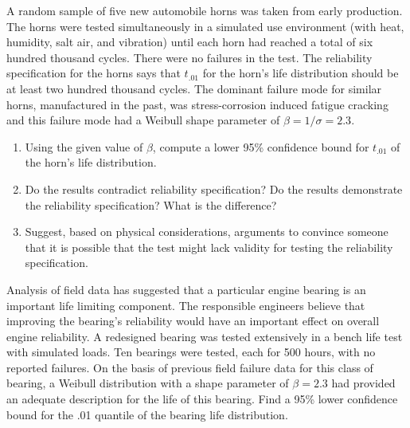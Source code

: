 \begin{exercise}
A random sample of five new automobile horns was taken from early
production.  The horns were tested simultaneously in a simulated use
environment (with heat, humidity, salt air, and vibration) until each
horn had reached a total of six hundred thousand cycles. There were no
failures in the test.  The reliability specification for the horns
says that $t_{.01}$ for the horn's life distribution should be at
least two hundred thousand cycles.  The dominant failure mode for
similar horns, manufactured in the past, was stress-corrosion induced
fatigue cracking and this failure mode had a Weibull shape parameter
of $\beta=1/\sigma=2.3$.
\begin{enumerate}
\item
Using the given value of $\beta$, compute a lower 95\% confidence
bound for $t_{.01}$ of the horn's life distribution.
\item
Do the results contradict reliability specification?  Do the results
demonstrate the reliability specification? What is the difference?
\item
Suggest, based on physical considerations, arguments to convince
someone that it is possible that the test might lack validity for
testing the reliability specification.
\end{enumerate}
\end{exercise}


\begin{exercise}
\label{exercise:zero.failures.weibull}
Analysis of field data has suggested that a particular engine bearing
is an important life limiting component.  The responsible engineers
believe
that
improving the bearing's reliability would have an important effect on
overall engine reliability.  A redesigned bearing was tested
extensively in a bench life test with simulated loads. Ten bearings
were tested, each for 500 hours, with no reported
failures. On the basis of previous field failure data
for this class of bearing, a Weibull
distribution with a shape parameter of $\beta=2.3$ had
provided an adequate 
description for the life of this bearing. Find a 95\% lower confidence
bound for the .01 quantile of the bearing life distribution.
\end{exercise}



